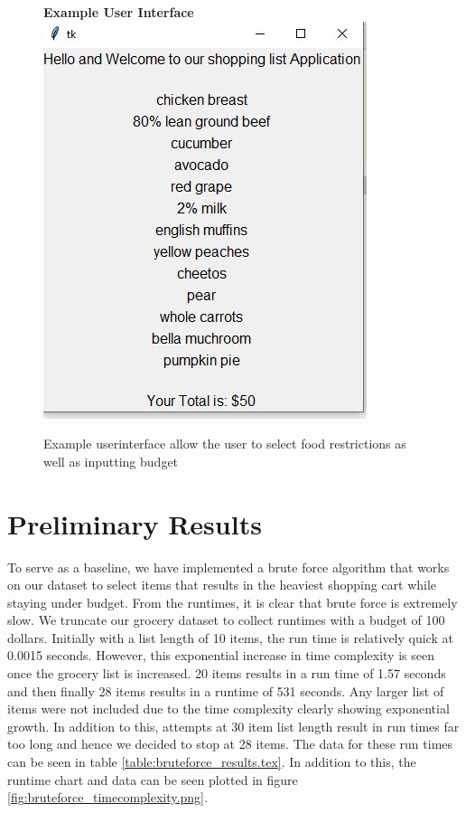 \documentclass[10pt,journal,compsoc]{IEEEtran}
\begin{document}
\begin{figure}[h]
    \centering
    \textbf{Example User Interface}
    \includegraphics[width=\columnwidth]{assets/AIprojectUI3.JPG}
    \caption{Example userinterface allow the user to select food restrictions as well as inputting budget}
    \label{fig:UI3}
\end{figure}

\section{Preliminary Results}
To serve as a baseline, we have implemented a brute force algorithm that works
on our dataset to select items that results in the heaviest shopping cart while
staying under budget. From the runtimes, it is clear that brute force is
extremely slow. We truncate our grocery dataset to collect runtimes with a
budget of 100 dollars. Initially with a list length of 10 items, the run time is
relatively quick at 0.0015 seconds. However, this exponential increase in time
complexity is seen once the grocery list is increased. 20 items results in a run
time of 1.57 seconds and then finally 28 items results in a runtime of 531
seconds. Any larger list of items were not included due to the time complexity
clearly showing exponential growth. In addition to this, attempts at 30 item
list length result in run times far too long and hence we decided to stop at 28
items. The data for these run times can be seen in table
\ref{table:bruteforce_results.tex}. In addition to this, the runtime chart and
data can be seen plotted in figure \ref{fig:bruteforce_timecomplexity.png}.
\end{document}

